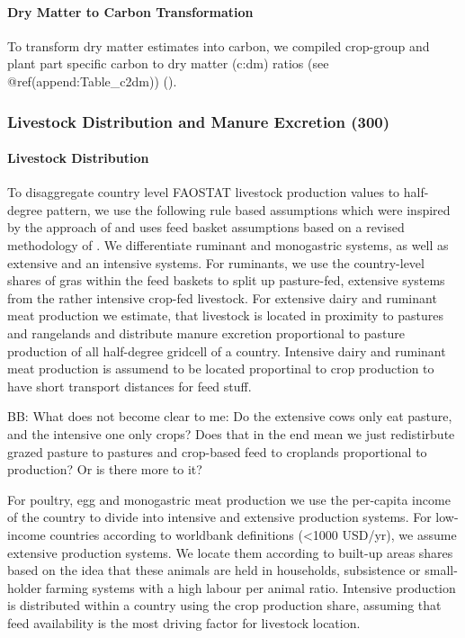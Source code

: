 \documentclass[gc, manuscript]{copernicus}
\begin{document}
\paragraph{Dry Matter to Carbon Transformation}

To transform dry matter estimates into carbon, we compiled crop-group
and plant part specific carbon to dry matter (c:dm) ratios (see
@ref(append:Table\_c2dm)) (\citet{Ma2018}).

\subsubsection{Livestock Distribution and Manure Excretion (300)}

\paragraph{Livestock Distribution}

To disaggregate country level FAOSTAT livestock production values to
half-degree pattern, we use the following rule based assumptions which
were inspired by the approach of \citep{gilbert} and uses feed basket
assumptions based on a revised methodology of \citet{weindl}. We
differentiate ruminant and monogastric systems, as well as extensive and
an intensive systems. For ruminants, we use the country-level shares of
gras within the feed baskets to split up pasture-fed, extensive systems
from the rather intensive crop-fed livestock. For extensive dairy and
ruminant meat production we estimate, that livestock is located in
proximity to pastures and rangelands and distribute manure excretion
proportional to pasture production of all half-degree gridcell of a
country. Intensive dairy and ruminant meat production is assumend to be
located proportinal to crop production to have short transport distances
for feed stuff.

BB: What does not become clear to me: Do the extensive cows only eat
pasture, and the intensive one only crops? Does that in the end mean we
just redistirbute grazed pasture to pastures and crop-based feed to
croplands proportional to production? Or is there more to it?

For poultry, egg and monogastric meat production we use the per-capita
income of the country to divide into intensive and extensive production
systems. For low-income countries according to worldbank definitions
(\textless1000 USD/yr), we assume extensive production systems. We
locate them according to built-up areas shares based on the idea that
these animals are held in households, subsistence or small-holder
farming systems with a high labour per animal ratio. Intensive
production is distributed within a country using the crop production
share, assuming that feed availability is the most driving factor for
livestock location.
\end{document}

